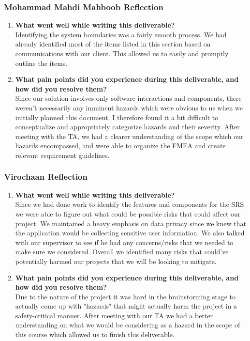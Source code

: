 \documentclass[12pt]{article}
\begin{document}
\subsubsection*{Mohammad Mahdi Mahboob Reflection}
\begin{enumerate}
    \item {\bf What went well while writing this deliverable?}\\
        Identifying the system boundaries was a fairly smooth process. We had already identified most of the items
        listed in this section based on communications with our client. This allowed us to easily and promptly outline
        the items.
    \item {\bf What pain points did you experience during this deliverable, and how did you resolve them?}\\
        Since our solution involves only software interactions and components, there weren't necessarily any imminent
        hazards which were obvious to us when we initially planned this document. I therefore found it a bit difficult
        to conceptualize and appropriately categorize hazards and their severity. After meeting with the TA, we
        had a clearer understanding of the scope which our hazards encompassed, and were able to organize the FMEA and
        create relevant requirement guidelines.
\end{enumerate}

\subsubsection*{Virochaan Reflection}
\begin{enumerate}
    \item \textbf{What went well while writing this deliverable?} \\
    Since we had done work to identify the features and components for the SRS we were able to figure out what could be possible risks that could affect our project. We maintained a heavy emphasis on data privacy since we knew that the application would be collecting sensitive user information. We also talked with our supervisor to see if he had any concerns/risks that we needed to make sure we considered. Overall we identified many risks that could've potentially harmed our projects that we will be looking to mitigate.
    \item \textbf{What pain points did you experience during this deliverable, and how did you resolve them?} \\
    Due to the nature of the project it was hard in the brainstorming stage to actually come up with "hazards" that might actually harm the project in a safety-critical manner. After meeting with our TA we had a better understanding on what we would be considering as a hazard in the scope of this course which allowed us to finish this deliverable.
\end{enumerate}
\end{document}
